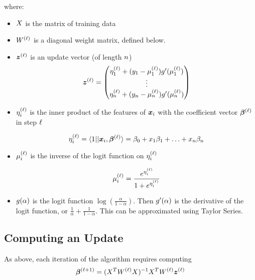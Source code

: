 where:
\begin{itemize}

	\item $X$ is the matrix of training data

	\item $W^{(\ell)}$ is a diagonal weight matrix, defined below.

	\item $\updatevector{\step}$ is an update vector (of length $n$)
\begin{equation*}
	\updatevector{\step} =
	\begin{pmatrix}
		\currentprediction{\step}_{1} +
		(\truelabel{1} - \logitestimate{\step}_{1})
		\gfunction'(\logitestimate{\step}_{1}) \\
		\vdots \\
		\currentprediction{\step}_{n} +
		 (\truelabel{\numdata} - \logitestimate{\step}_{\numdata})
		 \gfunction'(\logitestimate{\step}_{\numdata})
	\end{pmatrix}
\end{equation*}

\item $\eta^{(\ell)}_{i}$ is the inner product of the features of $\point{i}$ with the coefficient vector $\coefficients{\step}$ in step $\ell$
	
	\begin{equation*}
	\currentprediction{\step}_{i} = \innerproduct{1 || \point{i}}{\coefficients{\step}}  =\coeff_{0}+x_{1}\coeff_{1}+\ldots+x_{\numdata}\coeff_{\numdata}
\end{equation*}


	\item $\mu^{(\ell)}_{i}$ is the inverse of the logit function on $\eta^{(\ell)}_{i}$

\begin{equation}
	\mu^{(\ell)}_{i} = \frac{e^{\eta^{(\ell)}_{i}}}{1+e^{\eta^{(\ell)}_{i}}}
\end{equation}

	\item $g(\alpha)$ is the logit function $\log(\frac{\alpha}{1-\alpha})$. Then
$g'(\alpha)$ is the derivative of the logit function, or $\frac{1}{\alpha}+ \frac{1}{1-\alpha}$.
This can be approximated using Taylor Series.

\end{itemize}


\subsection{Computing an Update}
As above, each iteration of the algorithm requires computing
\begin{equation}
	\coefficients{\step+1} = \inversemat{(\transpose{\xdata}\wmatrix{\step}\xdata)}\transpose{\xdata} \wmatrix{\step}\updatevector{\step}
\end{equation}


